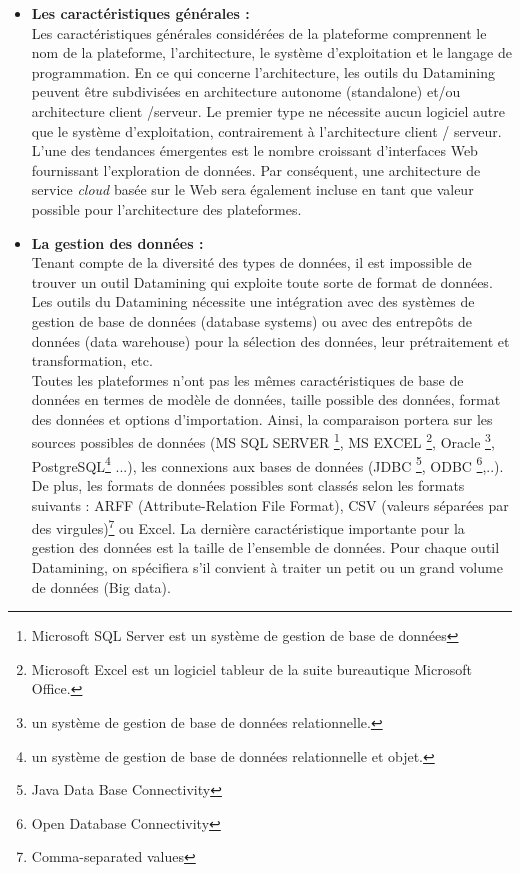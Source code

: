 \begin{itemize}
    \item[\ding{233}]\textbf{ Les caractéristiques générales :}\\
    Les caractéristiques générales considérées de la plateforme comprennent le nom de la plateforme, l'architecture, le système d’exploitation et le langage de programmation. En ce qui concerne l’architecture, les outils du Datamining peuvent être subdivisées en architecture autonome (standalone) et/ou architecture client /serveur. Le premier type ne nécessite aucun logiciel autre que le système d’exploitation, contrairement à l’architecture client / serveur. L'une des tendances émergentes est le nombre croissant d'interfaces Web fournissant l'exploration de données. Par conséquent, une architecture de service \textit{cloud} basée sur le Web sera également incluse en tant que valeur possible pour l'architecture des plateformes.\\
    
    \item[\ding{233}] \textbf{La gestion des données :}\\
    Tenant compte de la diversité des types de données, il est impossible de trouver un outil Datamining qui exploite toute sorte de format de données.
    Les outils du Datamining nécessite une intégration avec des systèmes de gestion de base de données (database systems) ou avec des entrepôts de données (data warehouse) pour la sélection des données, leur prétraitement et transformation, etc.\\ 
    
    Toutes les plateformes n’ont pas les mêmes caractéristiques de base de données en termes de modèle de données, taille possible des données, format des données et options d'importation. Ainsi, la comparaison portera sur les sources possibles de données (MS SQL SERVER \footnote{Microsoft SQL Server est un système de gestion de base de données}, MS EXCEL \footnote{Microsoft Excel est un logiciel tableur de la suite bureautique Microsoft Office.}, Oracle \footnote{un système de gestion de base de données relationnelle.}, PostgreSQL\footnote{un système de gestion de base de données relationnelle et objet.} ...), les connexions aux bases de données (JDBC \footnote{Java Data Base Connectivity}, ODBC \footnote{Open Database Connectivity},..).\\
    
    De plus, les formats de données possibles sont classés selon les formats suivants : ARFF (Attribute-Relation File Format), CSV (valeurs séparées par des virgules)\footnote{Comma-separated values} ou Excel. La dernière caractéristique importante pour la gestion des données est la taille de l'ensemble de données. Pour chaque outil Datamining, on spécifiera s'il convient à traiter un petit ou un grand volume de données (Big data).
    \\
    

\end{itemize}
